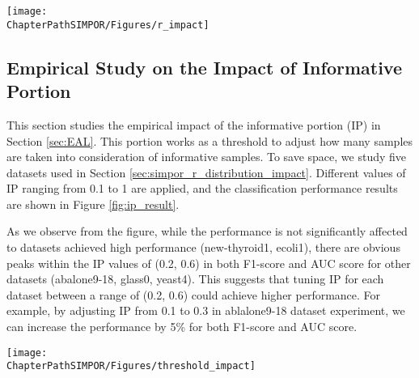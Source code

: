 \begin{figure*}[h]
	\centering
	\texttt{[image: \\ChapterPathSIMPOR/Figures/r\_impact]}
	\caption{F1-score and AUC results with varying Gaussian standard deviation.}
	\label{fig:r_result}
\end{figure*}


\subsection{Empirical Study on the Impact of Informative Portion}
This section studies the empirical impact of the informative portion (IP) in Section \ref{sec:EAL}. This portion works as a threshold to adjust how many samples are taken into consideration of informative samples. To save space, we study five datasets used in Section \ref{sec:simpor_r_distribution_impact}. Different values of IP ranging from 0.1 to 1 are applied, and the classification performance results are shown in Figure \ref{fig:ip_result}.

As we observe from the figure, while the performance is not significantly affected to datasets achieved high performance (new-thyroid1, ecoli1), there are obvious peaks within the IP values of (0.2, 0.6) in both F1-score and AUC score for other datasets (abalone9-18, glass0, yeast4). This suggests that tuning IP for each dataset between a range of (0.2, 0.6) could achieve higher performance. For example, by adjusting IP from 0.1 to 0.3 in ablalone9-18 dataset experiment, we can increase the performance by 5\% for both F1-score and AUC score. 

\begin{figure*}[h]
	\centering
	\texttt{[image: \\ChapterPathSIMPOR/Figures/threshold\_impact]}
	\caption{F1-score and AUC results with varying informative portion IP.}
	\label{fig:ip_result}
\end{figure*}






